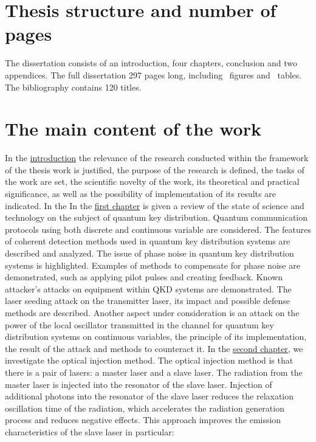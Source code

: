 \section*{Thesis structure and number of pages} The dissertation consists of an introduction, four chapters, conclusion and two appendices. The full dissertation 297 pages long, including \totalfigures\ figures and \totaltables\ tables. The bibliography contains 120 titles.

\section*{The main content of the work}
In the \underline{introduction} the relevance of the research conducted within the framework of the thesis work is justified, the purpose of the research is defined, the tasks of the work are set, the scientific novelty of the work, its theoretical and practical significance, as well as the possibility of implementation of its results are indicated. 
In the \newline In the \underline{first chapter} is given a review of the state of science and technology on the subject of quantum key distribution. Quantum communication protocols using both discrete and continuous variable are considered. The features of coherent detection methods used in quantum key distribution systems are described and analyzed. The issue of phase noise in quantum key distribution systems is highlighted. Examples of methods to compensate for phase noise are demonstrated, such as applying pilot pulses and creating feedback.  Known attacker's attacks on equipment within QKD systems are demonstrated. The laser seeding attack on the transmitter laser, its impact and possible defense methods are described. Another aspect under consideration is an attack on the power of the local oscillator transmitted in the channel for quantum key distribution systems on continuous variables, the principle of its implementation, the result of the attack and methods to counteract it.
\newline In the \underline{second chapter}, we investigate the optical injection method. The optical injection method is that there is a pair of lasers: a master laser and a slave laser. The radiation from the master laser is injected into the resonator of the slave laser. Injection of additional photons into the resonator of the slave laser reduces the relaxation oscillation time of the radiation, which accelerates the radiation generation process and reduces negative effects. This approach improves the emission characteristics of the slave laser in particular:
